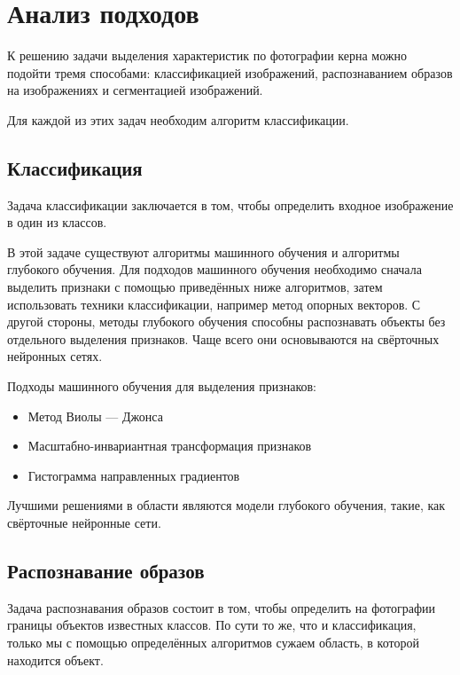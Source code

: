 \documentclass[14pt]{matmex-diploma}
\begin{document}
\section{Анализ подходов}
    
    К решению задачи выделения характеристик по фотографии керна можно подойти тремя способами: классификацией изображений, распознаванием образов на изображениях и сегментацией изображений.
    
    Для каждой из этих задач необходим алгоритм классификации.
    
    \subsection{Классификация}
    
        Задача классификации заключается в том, чтобы определить входное изображение в один из классов.
    
        В этой задаче существуют алгоритмы машинного обучения и алгоритмы глубокого обучения. Для подходов машинного обучения необходимо сначала выделить признаки с помощью приведённых ниже алгоритмов, затем использовать техники классификации, например метод опорных векторов. С другой стороны, методы глубокого обучения способны распознавать объекты без отдельного выделения признаков. Чаще всего они основываются на свёрточных нейронных сетях.
        
        Подходы машинного обучения для выделения признаков:
        \begin{itemize}
            \item Метод Виолы — Джонса
            \item Масштабно-инвариантная трансформация признаков
            \item Гистограмма направленных градиентов
        \end{itemize}
        
        Лучшими решениями в области являются модели глубокого обучения, такие, как свёрточные нейронные сети.
        
      
    \subsection{Распознавание образов}
    
        Задача распознавания образов состоит в том, чтобы определить на фотографии границы объектов известных классов. По сути то же, что и классификация, только мы с помощью определённых алгоритмов сужаем область, в которой находится объект.
    
\end{document}
